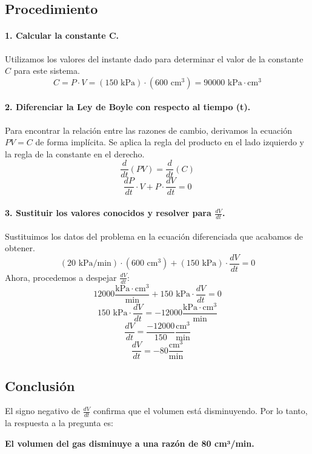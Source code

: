 \documentclass[12pt, letterpaper]{article}
\begin{document}
\subsection*{Procedimiento}

\paragraph{1. Calcular la constante C.}
Utilizamos los valores del instante dado para determinar el valor de la constante $C$ para este sistema.
$$
C = P \cdot V = (150 \text{ kPa}) \cdot (600 \text{ cm}^3) = 90000 \text{ kPa} \cdot \text{cm}^3
$$

\paragraph{2. Diferenciar la Ley de Boyle con respecto al tiempo (t).}
Para encontrar la relación entre las razones de cambio, derivamos la ecuación $PV = C$ de forma implícita. Se aplica la regla del producto en el lado izquierdo y la regla de la constante en el derecho.
$$
\frac{d}{dt}(PV) = \frac{d}{dt}(C)
$$
$$
\frac{dP}{dt} \cdot V + P \cdot \frac{dV}{dt} = 0
$$

\paragraph{3. Sustituir los valores conocidos y resolver para $\frac{dV}{dt}$.}
Sustituimos los datos del problema en la ecuación diferenciada que acabamos de obtener.
$$
(20 \text{ kPa/min}) \cdot (600 \text{ cm}^3) + (150 \text{ kPa}) \cdot \frac{dV}{dt} = 0
$$
Ahora, procedemos a despejar $\frac{dV}{dt}$:
$$
12000 \frac{\text{kPa} \cdot \text{cm}^3}{\text{min}} + 150 \text{ kPa} \cdot \frac{dV}{dt} = 0
$$
$$
150 \text{ kPa} \cdot \frac{dV}{dt} = -12000 \frac{\text{kPa} \cdot \text{cm}^3}{\text{min}}
$$
$$
\frac{dV}{dt} = \frac{-12000}{150} \frac{\text{cm}^3}{\text{min}}
$$
$$
\frac{dV}{dt} = -80 \frac{\text{cm}^3}{\text{min}}
$$

\subsection*{Conclusión}
El signo negativo de $\frac{dV}{dt}$ confirma que el volumen está disminuyendo. Por lo tanto, la respuesta a la pregunta es:
\vspace{1cm}

\begin{center}
\Large \textbf{El volumen del gas disminuye a una razón de 80 cm³/min.}
\end{center}
\end{document}
